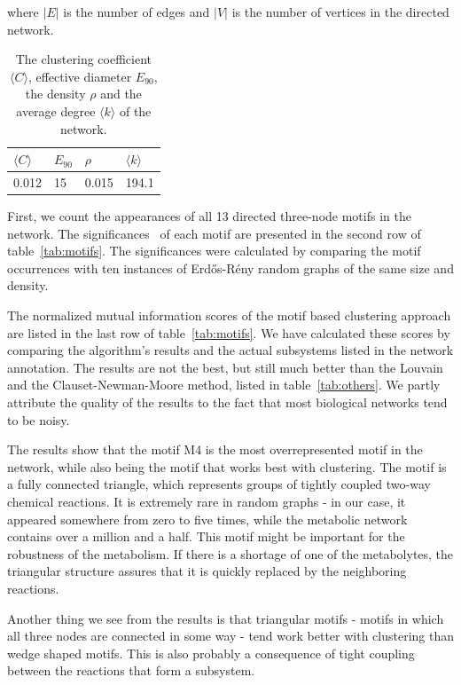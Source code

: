 \noindent
where $|E|$ is the number of edges and $|V|$ is the number of vertices in the
directed network.

\begin{table}
  \centering
  \begin{tabular}{l|l|l|l}
    $\langle C \rangle$ & $E_{90}$ & $\rho$ & $\langle k \rangle$ \\ \hline
    0.012 & 15 & 0.015 & 194.1
  \end{tabular}
  \caption{The clustering coefficient $\langle C\rangle$, effective diameter
    $E_{90}$, the density $\rho$ and the average degree $\langle k \rangle$ of
    the network.}
  \label{tab:metrics}
\end{table}

First, we count the appearances of all 13 directed three-node motifs in the
network. The significances~\cite{milo2002network} of each motif are presented in
the second row of table~\ref{tab:motifs}. The significances were calculated by
comparing the motif occurrences with ten instances of Erdős-Rény random graphs
of the same size and density.

The normalized mutual information scores of the motif based clustering approach
are listed in the last row of table~\ref{tab:motifs}. We have calculated these
scores by comparing the algorithm's results and the actual subsystems listed in
the network annotation. The results are not the best, but still much better than
the Louvain and the Clauset-Newman-Moore method, listed in
table~\ref{tab:others}. We partly attribute the quality of the results to the
fact that most biological networks tend to be noisy.

The results show that the motif M4 is the most overrepresented motif in the
network, while also being the motif that works best with clustering. The motif
is a fully connected triangle, which represents groups of tightly coupled
two-way chemical reactions. It is extremely rare in random graphs - in our case,
it appeared somewhere from zero to five times, while the metabolic network
contains over a million and a half. This motif might be important for the
robustness of the metabolism. If there is a shortage of one of the metabolytes,
the triangular structure assures that it is quickly replaced by the neighboring
reactions.

Another thing we see from the results is that triangular motifs - motifs in
which all three nodes are connected in some way - tend work better with
clustering than wedge shaped motifs. This is also probably a consequence of
tight coupling between the reactions that form a subsystem.

